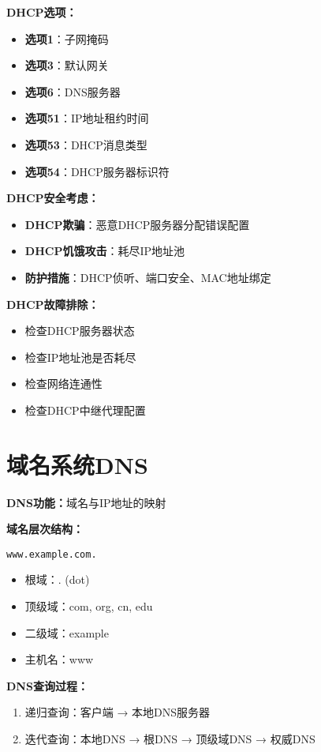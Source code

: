 \documentclass[lang=cn,newtx,10pt,scheme=chinese]{../../elegantbook}
\begin{document}
\textbf{DHCP选项：}
\begin{itemize}
  \item \textbf{选项1}：子网掩码
  \item \textbf{选项3}：默认网关
  \item \textbf{选项6}：DNS服务器
  \item \textbf{选项51}：IP地址租约时间
  \item \textbf{选项53}：DHCP消息类型
  \item \textbf{选项54}：DHCP服务器标识符
\end{itemize}

\textbf{DHCP安全考虑：}
\begin{itemize}
  \item \textbf{DHCP欺骗}：恶意DHCP服务器分配错误配置
  \item \textbf{DHCP饥饿攻击}：耗尽IP地址池
  \item \textbf{防护措施}：DHCP侦听、端口安全、MAC地址绑定
\end{itemize}

\textbf{DHCP故障排除：}
\begin{itemize}
  \item 检查DHCP服务器状态
  \item 检查IP地址池是否耗尽
  \item 检查网络连通性
  \item 检查DHCP中继代理配置
\end{itemize}

\section{域名系统DNS}

\textbf{DNS功能：}域名与IP地址的映射

\textbf{域名层次结构：}
\begin{center}
\texttt{www.example.com.}
\end{center}
\begin{itemize}
  \item 根域：. (dot)
  \item 顶级域：com, org, cn, edu
  \item 二级域：example
  \item 主机名：www
\end{itemize}

\textbf{DNS查询过程：}
\begin{enumerate}
  \item 递归查询：客户端 → 本地DNS服务器
  \item 迭代查询：本地DNS → 根DNS → 顶级域DNS → 权威DNS
\end{enumerate}
\end{document}
